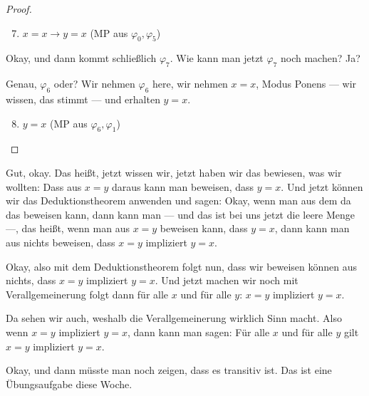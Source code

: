 \begin{proof}
\begin{math-stroke}
\begin{enumerate}[label=$\varphi_{\mathbf{\arabic*}}:$]
    \setcounter{enumi}{6} \item $x = x \rightarrow y = x$ \hfill (MP aus $\varphi_0, \varphi_5$)
\end{enumerate}
\end{math-stroke}

\begin{spoken-clean}[01:04:34 - 01:05:12]
Okay, und dann kommt schließlich $\varphi_7$. Wie kann man jetzt $\varphi_7$ noch machen? Ja?


Genau, $\varphi_6$ oder? Wir nehmen $\varphi_6$ here, wir nehmen $x=x$, Modus Ponens --- wir wissen, das stimmt --- und erhalten $y=x$.
\end{spoken-clean}

\begin{math-stroke}
\begin{enumerate}[label=$\varphi_{\mathbf{\arabic*}}:$]
    \setcounter{enumi}{7} \item $y = x$ \hfill (MP aus $\varphi_6, \varphi_1$)
\end{enumerate}
\end{math-stroke}
\end{proof}

\begin{spoken-clean}[01:05:13 - 01:06:53]
Gut, okay. Das heißt, jetzt wissen wir, jetzt haben wir das bewiesen, was wir wollten: Dass aus $x=y$ daraus kann man beweisen, dass $y=x$. Und jetzt können wir das Deduktionstheorem anwenden und sagen: Okay, wenn man aus dem da das beweisen kann, dann kann man --- und das ist bei uns jetzt die leere Menge ---, das heißt, wenn man aus $x=y$ beweisen kann, dass $y=x$, dann kann man aus nichts beweisen, dass $x=y$ impliziert $y=x$.


Okay, also mit dem Deduktionstheorem folgt nun, dass wir beweisen können aus nichts, dass $x=y$ impliziert $y=x$. Und jetzt machen wir noch mit Verallgemeinerung folgt dann für alle $x$ und für alle $y$: $x=y$ impliziert $y=x$.

Da sehen wir auch, weshalb die Verallgemeinerung wirklich Sinn macht. Also wenn $x=y$ impliziert $y=x$, dann kann man sagen: Für alle $x$ und für alle $y$ gilt $x=y$ impliziert $y=x$.

Okay, und dann müsste man noch zeigen, dass es transitiv ist. Das ist eine Übungsaufgabe diese Woche.
\end{spoken-clean}

